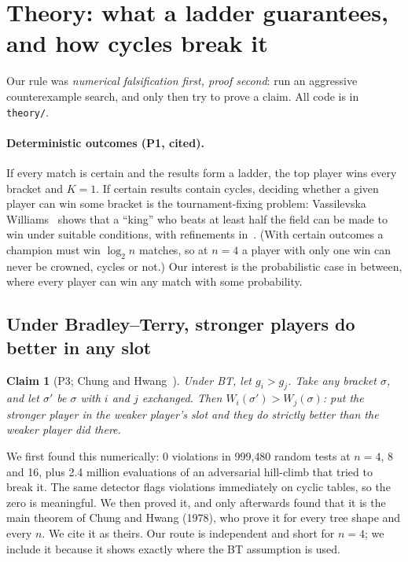 \documentclass[11pt]{article}
\newtheorem{claim}{Claim}
\theoremstyle{remark}
\begin{document}
\section{Theory: what a ladder guarantees, and how cycles break it}
\label{sec:theory}

Our rule was \emph{numerical falsification first, proof second}: run an aggressive counterexample search, and only then
try to prove a claim. All code is in \texttt{theory/}.

\paragraph{Deterministic outcomes (P1, cited).} If every match is certain and the results form a ladder, the top player wins
every bracket and $K=1$. If certain results contain cycles, deciding whether a given player can win some bracket is the
tournament-fixing problem: Vassilevska Williams~\cite{williams2010fixing} shows that a ``king'' who beats at least half the
field can be made to win under suitable conditions, with refinements in~\cite{kim2015fixing,manurangsi2022fixing}. (With
certain outcomes a champion must win $\log_2 n$ matches, so at $n=4$ a player with only one win can never be crowned, cycles or
not.) Our interest is the probabilistic case in between, where every player can win any match with some probability.

\subsection{Under Bradley--Terry, stronger players do better in any slot}
\begin{claim}[P3; Chung and Hwang~\cite{chung1978stronger}]
Under BT, let $g_i>g_j$. Take any bracket $\sigma$, and let $\sigma'$ be $\sigma$ with $i$ and $j$ exchanged. Then
$W_i(\sigma')>W_j(\sigma)$: put the stronger player in the weaker player's slot and they do strictly better than the weaker
player did there.
\end{claim}
We first found this numerically: 0 violations in 999{,}480 random tests at $n=4$, 8 and 16, plus 2.4 million evaluations of an
adversarial hill-climb that tried to break it. The same detector flags violations immediately on cyclic tables, so the zero
is meaningful. We then proved it, and only afterwards found that it is the main theorem of Chung and Hwang (1978), who prove
it for every tree shape and every $n$. We cite it as theirs. Our route is independent and short for $n=4$; we include it
because it shows exactly where the BT assumption is used.
\end{document}
